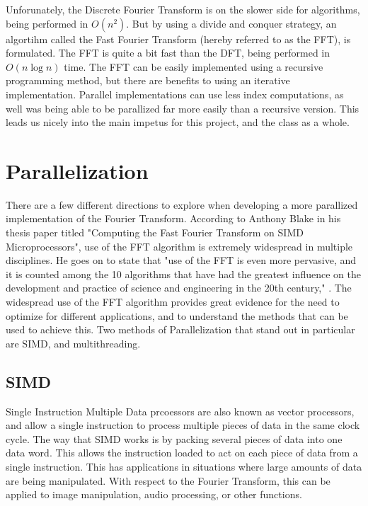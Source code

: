 \documentclass[12pt]{extarticle}
\begin{document}
    Unforunately, the Discrete Fourier Transform is on the slower side for algorithms, being performed in $O(n^2)$.
    But by using a divide and conquer strategy, an algortihm called the Fast Fourier Transform (hereby referred to as the FFT),
    is formulated. The FFT is quite a bit fast than the DFT, being performed in $O(n\log{}n)$ time. The FFT can be easily
    implemented using a recursive programming method, but there are benefits to using an iterative implementation. 
    Parallel implementations can use less index computations, as well was being able to be parallized far more easily
    than a recursive version. This leads us nicely into the main impetus for this project, and the class as a whole.

\maketitle
\newpage
\section*{Parallelization} 
    
    There are a few different directions to explore when developing a more
    parallized implementation of the Fourier Transform. 
    According to Anthony Blake in his thesis paper titled "Computing the Fast Fourier Transform on SIMD Microprocessors",
    use of the FFT algorithm is extremely widespread in multiple disciplines. He goes on to state that 
    "use of the FFT is even more pervasive, and it is counted among the 10 algorithms that have had the greatest influence 
    on the development and practice of science and engineering in the 20th century," \cite{Blake:2012}.
    The widespread use of the FFT algorithm provides great evidence for the need to optimize for different applications,
    and to understand the methods that can be used to achieve this.
    Two methods of Parallelization that stand out in particular are SIMD, and multithreading.

\subsection*{SIMD}
    
    Single Instruction Multiple Data prcoessors are also known as vector processors, and allow a single instruction
    to process multiple pieces of data in the same clock cycle. The way that SIMD works is by packing several pieces of data
    into one data word. This allows the instruction loaded to act on each piece of data from a single instruction.
    This has applications in situations where large amounts of data are being manipulated. With respect to the Fourier Transform,
    this can be applied to image manipulation, audio processing, or other functions.
\end{document}
